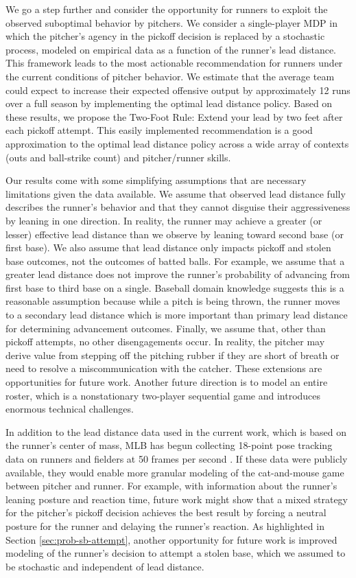 \documentclass[opre,dblanonrev]{informs4}
\begin{document}
    We go a step further and consider the opportunity for runners to exploit the observed suboptimal behavior by pitchers. We consider a single-player MDP in which the pitcher's agency in the pickoff decision is replaced by a stochastic process, modeled on empirical data as a function of the runner's lead distance.  This framework leads to the most actionable recommendation for runners under the current conditions of pitcher behavior. We estimate that the average team could expect to increase their expected offensive output by approximately 12 runs over a full season by implementing the optimal lead distance policy. Based on these results, we propose the Two-Foot Rule: Extend your lead by two feet after each pickoff attempt. This easily implemented recommendation is a good approximation to the optimal lead distance policy across a wide array of contexts (outs and ball-strike count) and pitcher/runner skills.

    Our results come with some simplifying assumptions that are necessary limitations given the data available. We assume that observed lead distance fully describes the runner's behavior and that they cannot disguise their aggressiveness by leaning in one direction. In reality, the runner may achieve a greater (or lesser) effective lead distance than we observe by leaning toward second base (or first base). We also assume that lead distance only impacts pickoff and stolen base outcomes, not the outcomes of batted balls. For example, we assume that a greater lead distance does not improve the runner's probability of advancing from first base to third base on a single. Baseball domain knowledge suggests this is a reasonable assumption because while a pitch is being thrown, the runner moves to a secondary lead distance which is more important than primary lead distance for determining advancement outcomes. Finally, we assume that, other than pickoff attempts, no other disengagements occur. In reality, the pitcher may derive value from stepping off the pitching rubber if they are short of breath or need to resolve a miscommunication with the catcher. These extensions are opportunities for future work. Another future direction is to model an entire roster, which is a nonstationary two-player sequential game and introduces enormous technical challenges.

    In addition to the lead distance data used in the current work, which is based on the runner's center of mass, MLB has begun collecting 18-point pose tracking data on runners and fielders at 50 frames per second \citep{jedlovec_introducing_2020}. If these data were publicly available, they would enable more granular modeling of the cat-and-mouse game between pitcher and runner. For example, with information about the runner's leaning posture and reaction time, future work might show that a mixed strategy for the pitcher's pickoff decision achieves the best result by forcing a neutral posture for the runner and delaying the runner's reaction. As highlighted in Section \ref{sec:prob-sb-attempt}, another opportunity for future work is improved modeling of the runner's decision to attempt a stolen base, which we assumed to be stochastic and independent of lead distance.
\end{document}
